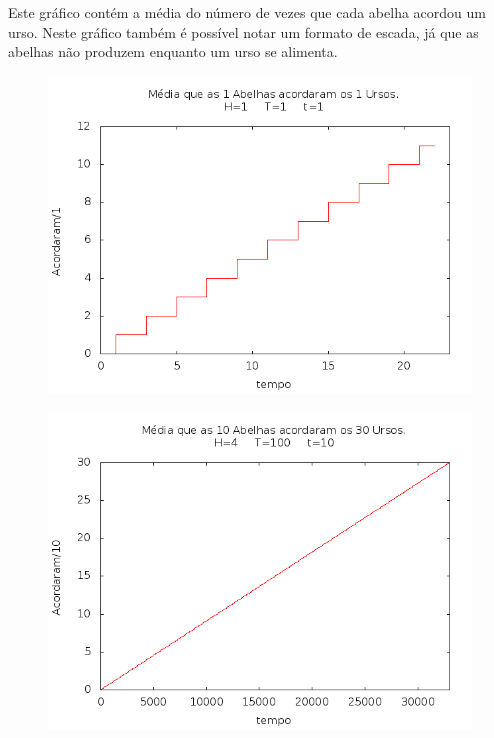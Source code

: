 \documentclass[12pt,a4paper]{article}
\begin{document}
Este gráfico contém a média do número de vezes que cada abelha acordou um urso. Neste gráfico também é possível notar um formato de escada, já que as abelhas não produzem enquanto um urso se alimenta.

\begin{figure}[!htb]
\centering
\includegraphics[width=0.7\paperwidth]{./graficos/abelhas_1_1_1_1_1.png}
\label{Rotulo}
\end{figure}


\begin{figure}[!htb]
\centering
\includegraphics[width=0.7\paperwidth]{./graficos/abelhas_10_30_4_10_100.png}
\label{Rotulo}
\end{figure}
\end{document}
